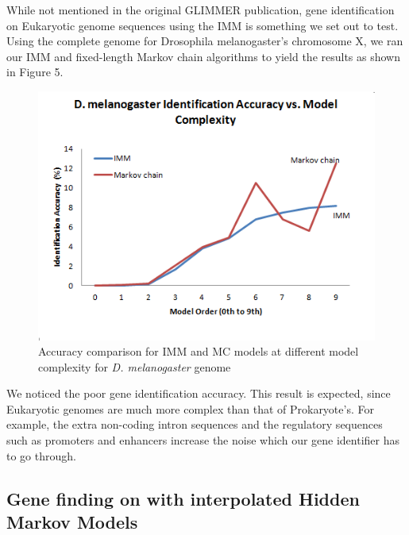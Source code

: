 \documentclass[11pt,letterpaper]{article}
\begin{document}
While not mentioned in the original GLIMMER publication, gene identification on Eukaryotic genome sequences using the IMM is something we set out to test. Using the complete genome for Drosophila melanogaster’s chromosome X, we ran our IMM and fixed-length Markov chain algorithms to yield the results as shown in Figure 5.

\begin{figure}
	\begin{center}
		\includegraphics[scale=0.8]{plots/accuracy_vs_model_complexity_drosophila.png}
	\end{center}
	\caption{\label{font-table} Accuracy comparison for IMM and MC models at different model complexity for \emph{D. melanogaster} genome}
\end{figure}

We noticed the poor gene identification accuracy. This result is expected, since Eukaryotic genomes are much more complex than that of Prokaryote’s. For example, the extra non-coding intron sequences and the regulatory sequences such as promoters and enhancers increase the noise which our gene identifier has to go through. 

\subsection{Gene finding on with interpolated Hidden Markov Models}
\end{document}
